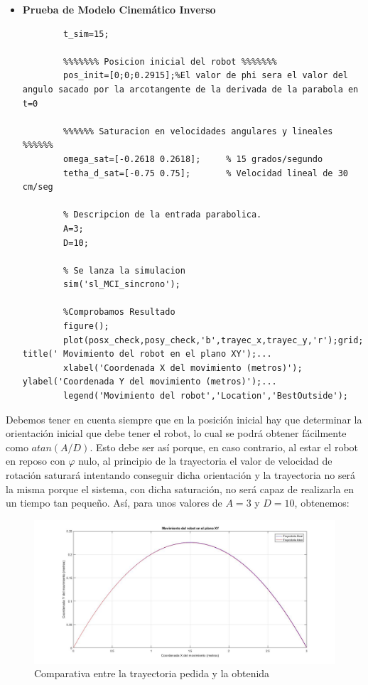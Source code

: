 \documentclass[a4paper,twoside]{article}
\begin{document}
	\begin{itemize}
		\item \textbf{Prueba de Modelo Cinemático Inverso} 
		\lstset{language=Matlab,columns=flexible,keepspaces=true}
		
		\begin{lstlisting}[frame=single]
		%Tiempo de simulacion
		t_sim=15;
		
		%%%%%%% Posicion inicial del robot %%%%%%%
		pos_init=[0;0;0.2915];%El valor de phi sera el valor del angulo sacado por la arcotangente de la derivada de la parabola en t=0
		
		%%%%%% Saturacion en velocidades angulares y lineales %%%%%%
		omega_sat=[-0.2618 0.2618];     % 15 grados/segundo
		tetha_d_sat=[-0.75 0.75];       % Velocidad lineal de 30 cm/seg
		
		% Descripcion de la entrada parabolica.
		A=3;
		D=10;
		
		% Se lanza la simulacion
		sim('sl_MCI_sincrono');
		
		%Comprobamos Resultado
		figure();
		plot(posx_check,posy_check,'b',trayec_x,trayec_y,'r');grid; title(' Movimiento del robot en el plano XY');...
		xlabel('Coordenada X del movimiento (metros)'); ylabel('Coordenada Y del movimiento (metros)');...
		legend('Movimiento del robot','Location','BestOutside');
		\end{lstlisting} 
	\end{itemize}
	
	Debemos tener en cuenta siempre que en la posición inicial hay que determinar la orientación inicial que debe tener el robot, lo cual se podrá obtener fácilmente como $atan(A/D)$. Esto debe ser así porque, en caso contrario, al estar el robot en reposo con $\varphi$ nulo, al principio de la trayectoria el valor de velocidad de rotación saturará intentando conseguir dicha orientación y la trayectoria no será la misma porque el sistema, con dicha saturación, no será capaz de realizarla en un tiempo tan pequeño. Así, para unos valores de $A=3$ y $D=10$, obtenemos:
	
	\begin{figure}[H]
		\centering
		\includegraphics[width=1.1\textwidth]{parab_1}
		\caption{Comparativa entre la trayectoria pedida y la obtenida}
	\end{figure}
	
\end{document}
